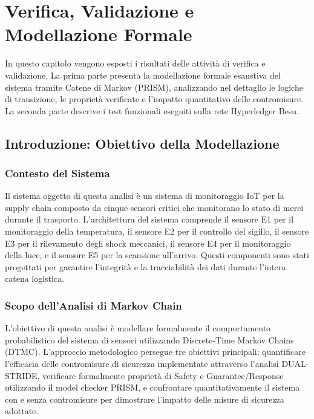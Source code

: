 \chapter{Verifica, Validazione e Modellazione Formale}

\begin{preamble}
In questo capitolo vengono esposti i risultati delle attività di verifica e validazione. La prima parte presenta la modellazione formale esaustiva del sistema tramite Catene di Markov (PRISM), analizzando nel dettaglio le logiche di transizione, le proprietà verificate e l'impatto quantitativo delle contromisure. La seconda parte descrive i test funzionali eseguiti sulla rete Hyperledger Besu.
\end{preamble}

\section{Introduzione: Obiettivo della Modellazione}

\subsection{Contesto del Sistema}
Il sistema oggetto di questa analisi è un sistema di monitoraggio IoT per la supply chain composto da cinque sensori critici che monitorano lo stato di merci durante il trasporto. L'architettura del sistema comprende il sensore E1 per il monitoraggio della temperatura, il sensore E2 per il controllo del sigillo, il sensore E3 per il rilevamento degli shock meccanici, il sensore E4 per il monitoraggio della luce, e il sensore E5 per la scansione all'arrivo. Questi componenti sono stati progettati per garantire l'integrità e la tracciabilità dei dati durante l'intera catena logistica.

\subsection{Scopo dell'Analisi di Markov Chain}
L'obiettivo di questa analisi è modellare formalmente il comportamento probabilistico del sistema di sensori utilizzando Discrete-Time Markov Chains (DTMC). L'approccio metodologico persegue tre obiettivi principali: quantificare l'efficacia delle contromisure di sicurezza implementate attraverso l'analisi DUAL-STRIDE, verificare formalmente proprietà di Safety e Guarantee/Response utilizzando il model checker PRISM, e confrontare quantitativamente il sistema con e senza contromisure per dimostrare l'impatto delle misure di sicurezza adottate.

